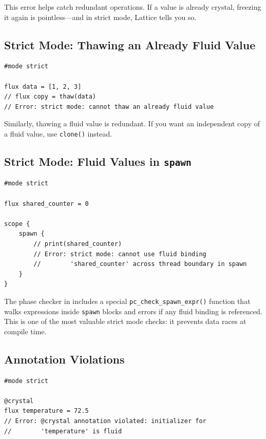 This error helps catch redundant operations.
If a value is already crystal, freezing it again is pointless---and in strict mode, Lattice tells you so.

\subsection{Strict Mode: Thawing an Already Fluid Value}

\begin{lstlisting}[language=Lattice, caption={Thawing a fluid value in strict mode}]
#mode strict

flux data = [1, 2, 3]
// flux copy = thaw(data)
// Error: strict mode: cannot thaw an already fluid value
\end{lstlisting}

Similarly, thawing a fluid value is redundant.
If you want an independent copy of a fluid value, use \lstinline|clone()| instead.

\subsection{Strict Mode: Fluid Values in \texttt{spawn}}

\begin{lstlisting}[language=Lattice, caption={Fluid value crossing spawn boundary}]
#mode strict

flux shared_counter = 0

scope {
    spawn {
        // print(shared_counter)
        // Error: strict mode: cannot use fluid binding
        //        'shared_counter' across thread boundary in spawn
    }
}
\end{lstlisting}

The phase checker in  includes a special \lstinline|pc_check_spawn_expr()| function that walks expressions inside \lstinline|spawn| blocks and errors if any fluid binding is referenced.
This is one of the most valuable strict mode checks: it prevents data races at compile time.

\subsection{Annotation Violations}

\begin{lstlisting}[language=Lattice, caption={Phase annotation violation}]
#mode strict

@crystal
flux temperature = 72.5
// Error: @crystal annotation violated: initializer for
//        'temperature' is fluid
\end{lstlisting}

